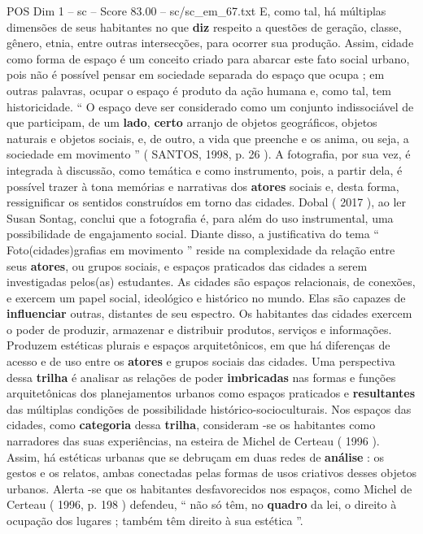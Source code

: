 \begin{textsample}{POS Dim 1 – sc – Score 83.00 – sc/sc\_em\_67.txt}
E, como tal, há múltiplas dimensões de seus habitantes no que \textbf{diz} respeito a questões de geração, classe, gênero, etnia, entre outras intersecções, para ocorrer sua produção.
Assim, cidade como forma de espaço é um conceito criado para abarcar este fato social urbano, pois não é possível pensar em sociedade separada do espaço que ocupa ; em outras palavras, ocupar o espaço é produto da ação humana e, como tal, tem historicidade. “ O espaço deve ser considerado como um conjunto indissociável de que participam, de um \textbf{lado}, \textbf{certo} arranjo de objetos geográficos, objetos naturais e objetos sociais, e, de outro, a vida que preenche e os anima, ou seja, a sociedade em movimento ” ( SANTOS, 1998, p. 26 ).
A fotografia, por sua vez, é integrada à discussão, como temática e como instrumento, pois, a partir dela, é possível trazer à tona memórias e narrativas dos \textbf{atores} sociais e, desta forma, ressignificar os sentidos construídos em torno das cidades.
Dobal ( 2017 ), ao ler Susan Sontag, conclui que a fotografia é, para além do uso instrumental, uma possibilidade de engajamento social.
Diante disso, a justificativa do tema “ Foto(cidades)grafias em movimento ” reside na complexidade da relação entre seus \textbf{atores}, ou grupos sociais, e espaços praticados das cidades a serem investigadas pelos(as) estudantes.
As cidades são espaços relacionais, de conexões, e exercem um papel social, ideológico e histórico no mundo.
Elas são capazes de \textbf{influenciar} outras, distantes de seu espectro.
Os habitantes das cidades exercem o poder de produzir, armazenar e distribuir produtos, serviços e informações.
Produzem estéticas plurais e espaços arquitetônicos, em que há diferenças de acesso e de uso entre os \textbf{atores} e grupos sociais das cidades.
Uma perspectiva dessa \textbf{trilha} é analisar as relações de poder \textbf{imbricadas} nas formas e funções arquitetônicas dos planejamentos urbanos como espaços praticados e \textbf{resultantes} das múltiplas condições de possibilidade histórico-socioculturais.
Nos espaços das cidades, como \textbf{categoria} dessa \textbf{trilha}, consideram -se os habitantes como narradores das suas experiências, na esteira de Michel de Certeau ( 1996 ).
Assim, há estéticas urbanas que se debruçam em duas redes de \textbf{análise} : os gestos e os relatos, ambas conectadas pelas formas de usos criativos desses objetos urbanos.
Alerta -se que os habitantes desfavorecidos nos espaços, como Michel de Certeau ( 1996, p. 198 ) defendeu, “ não só têm, no \textbf{quadro} da lei, o direito à ocupação dos lugares ; também têm direito à sua estética ”.

\end{textsample}
